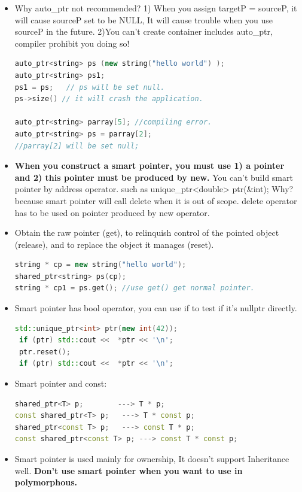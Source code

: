 \documentclass[a4paper,12pt,twoside]{book}
\begin{document}
\begin{itemize}
\item Why auto\_ptr not recommended? 1) When you assign targetP = sourceP, it will cause sourceP set to be NULL, It will cause trouble when you use sourceP in the future.  2)You can't create container includes auto\_ptr, compiler prohibit you doing so!
\begin{lstlisting}[frame=single, language=c++]
auto_ptr<string> ps (new string("hello world") );
auto_ptr<string> ps1;
ps1 = ps;   // ps will be set null.
ps->size() // it will crash the application.

auto_ptr<string> parray[5]; //compiling error.
auto_ptr<string> ps = parray[2];
//parray[2] will be set null;
\end{lstlisting}

\item \textbf{When you construct a smart pointer, you must use 1) a pointer and 2) this pointer must be produced by new.} You can't build smart pointer by address operator. such as unique\_ptr<double> ptr(\&int);   Why? because smart pointer will call delete when it is out of scope.  delete operator has to be used on pointer produced by new operator.

\item Obtain the raw pointer (get), to relinquish control of the pointed object (release), and to replace the object it manages (reset).
\begin{lstlisting}[frame=single, language=c++]
string * cp = new string("hello world");
shared_ptr<string> ps(cp);
string * cp1 = ps.get(); //use get() get normal pointer.
\end{lstlisting}


\item Smart pointer has bool operator, you can use if to test if it's nullptr directly.
\begin{lstlisting}[frame=single, language=c++]
 std::unique_ptr<int> ptr(new int(42));
 if (ptr) std::cout <<  *ptr << '\n';
 ptr.reset();
 if (ptr) std::cout <<  *ptr << '\n';
\end{lstlisting}

\item Smart pointer and const:
\begin{lstlisting}[frame=single, language=c++]
shared_ptr<T> p;        ---> T * p;
const shared_ptr<T> p;   ---> T * const p;
shared_ptr<const T> p;   ---> const T * p;
const shared_ptr<const T> p; ---> const T * const p;
\end{lstlisting}

\item Smart pointer is used mainly for ownership, It doesn't support Inheritance well. \textbf{Don't use smart pointer when you want to use in polymorphous.}

\end{itemize}
\end{document}
